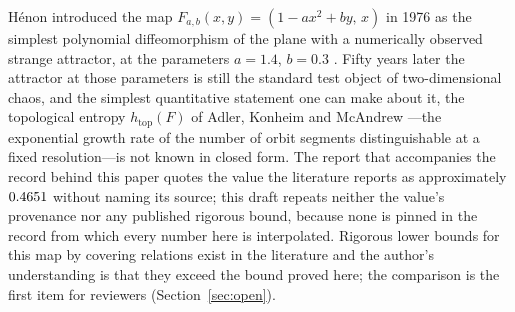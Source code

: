 \documentclass[11pt]{article}
\newcommand{\htop}{h_{\mathrm{top}}}
\begin{document}
H\'enon introduced the map $F_{a,b}(x,y)=(1-ax^2+by,\,x)$ in 1976 as the simplest polynomial diffeomorphism of the
plane with a numerically observed strange attractor, at the parameters $a=1.4$, $b=0.3$ \cite{Henon76}. Fifty years
later the attractor at those parameters is still the standard test object of two-dimensional chaos, and the simplest
quantitative statement one can make about it, the topological entropy $\htop(F)$ of Adler, Konheim and McAndrew
\cite{AKM65}---the exponential growth rate of the number of orbit segments distinguishable at a fixed resolution---is
not known in closed form. The report that accompanies the record behind this paper quotes the value the literature
reports as approximately $0.4651$ without naming its source; this draft repeats neither the value's provenance nor
any published rigorous bound, because none is pinned in the record from which every number here is interpolated.
Rigorous lower bounds for this map by covering relations exist in the literature and the author's understanding is
that they exceed the bound proved here; the comparison is the first item for reviewers (Section~\ref{sec:open}).
\end{document}
